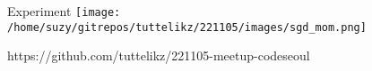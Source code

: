     \begin{frame}{Experiment}
      \centering
        \texttt{[image: /home/suzy/gitrepos/tuttelikz/221105/images/sgd\_mom.png]}

        https://github.com/tuttelikz/221105-meetup-codeseoul
      \end{frame}

  \begin{frame}
    \printbibliography
  \end{frame} 



